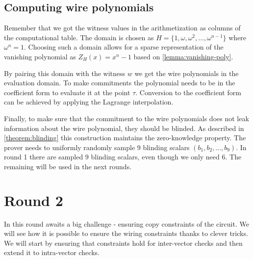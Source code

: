 \subsection{Computing wire polynomials}
Remember that we got the witness values in the arithmetization as columns of the computational table. The domain is chosen as $H = \{1, \omega, \omega^2, \ldots, \omega^{n-1}\}$ where $\omega^n = 1$. Choosing such a domain allows for a sparse representation of the vanishing polynomial as $Z_H(x) = x^n -1$ based on \cref{lemma:vanishing-poly}.

By pairing this domain with the witness $w$ we get the wire polynomials in the evaluation domain. To make commitments the polynomial needs to be in the coefficient form to evaluate it at the point $\tau$. Conversion to the coefficient form can be achieved by applying the Lagrange interpolation.

Finally, to make sure that the commitment to the wire polynomials does not leak information about the wire polynomial, they should be blinded. As described in \cref{theorem:blinding} this construction maintains the zero-knowledge property. The prover needs to uniformly randomly sample 9 blinding scalars $(b_1, b_2, \ldots, b_9)$. In round 1 there are sampled 9 blinding scalars, even though we only need 6. The remaining will be used in the next rounds.



\section{Round 2}
\label{chap:round2}

In this round awaits a big challenge - ensuring copy constraints of the circuit. We will see how it is possible to ensure the wiring constraints thanks to clever tricks. We will start by ensuring that constraints hold for inter-vector checks and then extend it to intra-vector checks.

